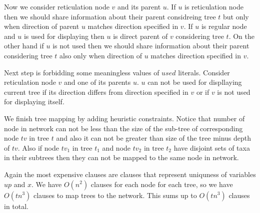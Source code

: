 \documentclass[runningheads, envcountsame, a4paper]{llncs}
\begin{document}
Now we consider reticulation node $v$ and its parent $u$. If $u$ is reticulation node then we should share information 
about their parent considreing tree $t$ but only when direction of parent $u$ matches direction specified in $v$. 
If $u$ is regular node and $u$ is used for displaying then $u$ is direct parent of $v$ considering tree $t$.
On the other hand if $u$ is not used then we should share information about their parent considering tree $t$ also 
only when direction of $u$ matches direction specified in $v$.

Next step is forbidding some meaningless values of $used$ literals. Consider reticulation node $v$ and one of its parents $u$. 
$u$ can not be used for displlaying current tree if its direction differs from direction specified in $v$ or if $v$ is 
not used for displaying itself.

We finish tree mapping by adding heuristic constraints. Notice that number of node in network can not be less than the 
size of the sub-tree of corresponding node $tv$ in tree $t$ and also it can not be greater than size of the tree minus 
depth of $tv$. Also if node $tv_1$ in tree $t_1$ and node $tv_2$ in tree $t_2$ have disjoint sets of taxa in their 
subtrees then they can not be mapped to the same node in network.

Again the most expensive clauses are clauses that represent uniquness of variables $up$ and $x$. We have $O(n^2)$ clauses for
each node for each tree, so we have $O(tn^3)$ clauses to map trees to the network. This sums up to $O(tn^3)$ clauses in total.
\end{document}
